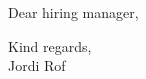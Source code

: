 \documentclass[11pt, a4paper]{article}
\begin{document}
\begin{minipage}[t]{0.56\textwidth}
\setlength{\parskip}{0.8ex}%

\bigskip
\bigskip


Dear hiring manager,

\bigskip
\bigskip
\bigskip

\lipsum[1-4]

\bigskip
\bigskip
\bigskip

Kind regards,\\
Jordi Rof


\normalsize
\end{minipage}
\end{document}
